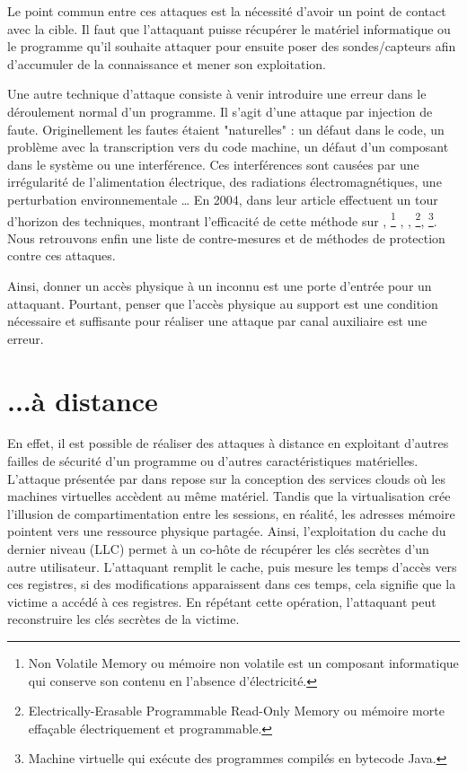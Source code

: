 Le point commun entre ces attaques est la nécessité d'avoir un point de contact avec la cible. Il faut que l'attaquant puisse récupérer le matériel informatique ou le programme qu'il souhaite attaquer pour ensuite poser des sondes/capteurs afin d'accumuler de la connaissance et mener son exploitation.\bigbreak


Une autre technique d'attaque consiste à venir introduire une erreur dans le déroulement normal d'un programme. Il s'agit d'une attaque par injection de faute. Originellement \cite{faultOverview} les fautes étaient "naturelles" : un défaut dans le code, un problème avec la transcription vers du code machine, un défaut d'un composant dans le système ou une interférence. Ces interférences sont causées par une irrégularité de l'alimentation électrique, des radiations électromagnétiques, une perturbation environnementale \etc\dots
En 2004, \citeauthor{Fault_Attacks} dans leur article  \cite{Fault_Attacks} effectuent un tour d'horizon des techniques, montrant l'efficacité de cette méthode sur 
, \footnote{Non Volatile Memory ou mémoire non volatile est un composant informatique qui conserve son contenu en l'absence d'électricité.}
, %
, \footnote{Electrically-Erasable Programmable Read-Only Memory ou mémoire morte effaçable électriquement et programmable.}, \footnote{Machine virtuelle qui exécute des programmes compilés en bytecode Java.}. Nous retrouvons enfin une liste de contre-mesures et de méthodes de protection contre ces attaques.\medbreak

Ainsi, donner un accès physique à un inconnu est une porte d'entrée pour un attaquant. Pourtant, penser que l'accès physique au support est une condition nécessaire et suffisante pour réaliser une attaque par canal auxiliaire est une erreur.

\section{...à distance}

En effet, il est possible de réaliser des attaques à distance en exploitant d'autres failles de sécurité d'un programme ou d'autres caractéristiques matérielles. L'attaque présentée par \citeauthor{LLC_attack} dans  \cite{LLC_attack} repose sur la conception des services clouds où les machines virtuelles accèdent au même matériel. Tandis que la virtualisation crée l'illusion de compartimentation entre les sessions, en réalité, les adresses mémoire pointent vers une ressource physique partagée. Ainsi, l'exploitation du cache du dernier niveau (LLC) permet à un co-hôte de récupérer les clés secrètes d'un autre utilisateur. L'attaquant remplit le cache, puis mesure les temps d'accès vers ces registres, si des modifications apparaissent dans ces temps, cela signifie que la victime a accédé à ces registres. En répétant cette opération, l'attaquant peut reconstruire les clés secrètes de la victime.\medbreak


